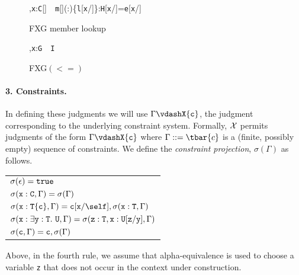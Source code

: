 \begin{figure*}
\begin{minipage}{\textwidth}
  {\Gamma,{\tt x}:{\tt C}[]~\has~{\tt m}[](:)\{{\tt l}[{\tt x}/\this]\}:{\tt H}[{\tt x}/\this]={\tt e}[{\tt x}/\this]}
\end{minipage}%
\caption{{\sf FXG} member lookup}
\label{fig:lookup}
\end{figure*}



\begin{figure*}
\vspace{-\bigskipamount}
\begin{minipage}{.4\textwidth}
\quad{}
	{\Gamma{}}
\end{minipage}%
\begin{minipage}{.37\textwidth}
\quad{}
	{\Gamma,{\tt x}:{\tt G}~\has~{\tt I}}
\end{minipage}%
\begin{minipage}{.23\textwidth}
\quad{}
\end{minipage}%
\caption{{\sf FXG}$(<=)$}
\label{fig:FXG}
\end{figure*}

\paragraph{3. Constraints.}
In defining these judgments we will use \mbox{$\Gamma \vdashX {\tt c}$}, the judgment corresponding to the underlying constraint system. Formally, $\cal X$ permits judgments of the form $\Gamma \vdashX {\tt c}$ where $\Gamma::=\tbar{c}$ is a (finite, possibly empty) sequence of constraints. We define the {\em constraint
projection}, $\sigma(\Gamma)$ as follows.
%
\begin{center}
\begin{tabular}{l}
$\sigma(\epsilon)={\tt true}$\\
$\sigma({\tt x}:{\tt C}, \Gamma)=\sigma(\Gamma)$\\
$\sigma({\tt x}:{\tt T\{c\}}, \Gamma)={\tt c}[{\tt x}/\self], \sigma({\tt x}:{\tt T},\Gamma)$\\
$\sigma({\tt x}:\exists {\tt y}:{\tt T}.~{\tt U}, \Gamma)=\sigma({\tt z:T}, {\tt x}:{\tt U[{\tt z}/{\tt y}]},\Gamma)$\\
$\sigma({\tt c},\Gamma) = {\tt c}, \sigma(\Gamma)$
\end{tabular}
\end{center}
%
Above, in the fourth rule, 
we assume that alpha-equivalence is used to
choose a variable {\tt z} that does not
occur in the context under construction.

